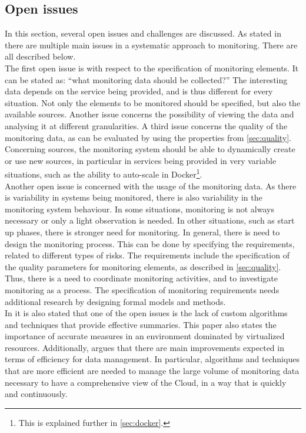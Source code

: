 \subsection{Open issues} \label{sec:open_issues}
In this section, several open issues and challenges are discussed. As stated in \cite{pernici2016monitoring, aceto2013cloud} there are multiple main issues in a systematic approach to monitoring. There are all described below.\\

\noindent
The first open issue is with respect to the specification of monitoring elements. It can be stated as: ``what monitoring data should be collected?'' The interesting data depends on the service being provided, and is thus different for every situation. Not only the elements to be monitored should be specified, but also the available sources. Another issue concerns the possibility of viewing the data and analysing it at different granularities. A third issue concerns the quality of the monitoring data, as can be evaluated by using the properties from \autoref{sec:quality}. Concerning sources, the monitoring system should be able to dynamically create or use new sources, in particular in services being provided in very variable situations, such as the ability to auto-scale in Docker\footnote{This is explained further in \autoref{sec:docker}.}.\\

\noindent
Another open issue is concerned with the usage of the monitoring data. As there is variability in systems being monitored, there is also variability in the monitoring system behaviour. In some situations, monitoring is not always necessary or only a light observation is needed. In other situations, such as start up phases, there is stronger need for monitoring. In general, there is need to design the monitoring process. This can be done by specifying the requirements, related to different types of risks. The requirements include the specification of the quality parameters for monitoring elements, as described in \autoref{sec:quality}. Thus, there is a need to coordinate monitoring activities, and to investigate monitoring as a process. The specification of monitoring requirements needs additional research by designing formal models and methods.\\

\noindent
In \cite{aceto2013cloud} it is also stated that one of the open issues is the lack of custom algorithms and techniques that provide effective summaries. This paper also states the importance of accurate measures in an environment dominated by virtualized resources. Additionally, \cite{aceto2013cloud} argues that there are main improvements expected in terms of efficiency for data management. In particular, algorithms and techniques that are more efficient are needed to manage the large volume of monitoring data necessary to have a comprehensive view of the Cloud, in a way that is quickly and continuously.\\

